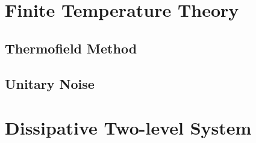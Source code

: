 \section{Finite Temperature Theory}
\label{sec:nmqsd.temperature}

\subsection{Thermofield Method}
\label{sub:nmqsd.temperature.thermofield}

\subsection{Unitary Noise}
\label{sub:nmqsd.temperature.unitary}


\section{Dissipative Two-level System}
\label{sec:nmqsd.twolevel}

